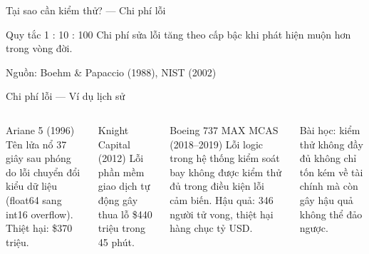 \documentclass[aspectratio=169,12pt]{beamer}
\begin{document}
\begin{frame}[fragile]{Tại sao cần kiểm thử? --- Chi phí lỗi}
  \begin{block}{Quy tắc 1 : 10 : 100}
    Chi phí sửa lỗi tăng theo cấp bậc khi phát hiện muộn hơn trong vòng đời.
  \end{block}

  \vspace{0.5em}
  \begin{center}
  \end{center}

  \vspace{-0.3em}
  {\small Nguồn: Boehm \& Papaccio (1988), NIST (2002)}
\end{frame}

\begin{frame}{Chi phí lỗi --- Ví dụ lịch sử}
  \begin{columns}
    \begin{alertblock}{Ariane 5 (1996)}
      Tên lửa nổ 37 giây sau phóng do lỗi chuyển đổi kiểu dữ liệu (float64
      sang int16 overflow). Thiệt hại: \$370 triệu.
    \end{alertblock}

    \begin{alertblock}{Knight Capital (2012)}
      Lỗi phần mềm giao dịch tự động gây thua lỗ \$440 triệu trong 45 phút.
    \end{alertblock}

    \begin{alertblock}{Boeing 737 MAX MCAS (2018--2019)}
      Lỗi logic trong hệ thống kiểm soát bay không được kiểm thử đủ trong
      điều kiện lỗi cảm biến. Hậu quả: 346 người tử vong, thiệt hại hàng
      chục tỷ USD.
    \end{alertblock}

    \vspace{0.3em}
    {\small Bài học: kiểm thử không đầy đủ không chỉ tốn kém về tài chính
    mà còn gây hậu quả không thể đảo ngược.}
  \end{columns}
\end{frame}
\end{document}
